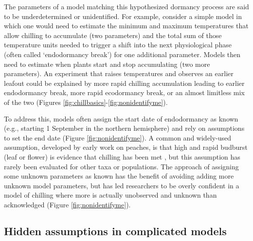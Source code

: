 \documentclass[11pt]{article}
\begin{document}
The parameters of a model matching this hypothesized dormancy process are said to be underdetermined or unidentified. For example, consider a simple model in which one would need to estimate the minimum and maximum temperatures that allow chilling to accumulate (two parameters) and the total sum of those temperature units needed to trigger a shift into the next physiological phase (often called `endodormancy break') for one additional parameter. Models then need to estimate when plants start and stop accumulating (two more parameters). An experiment that raises temperatures and observes an earlier leafout could be explained by more rapid chilling accumulation leading to earlier endodormancy break, more rapid ecodormancy break, or an almost limitless mix of the two (Figures \ref{fig:chillbasics}-\ref{fig:nonidentifyme}). %

To address this, models often assign the start date of endodormancy as known (e.g., starting 1 September in the northern hemisphere) and rely on assumptions to set the end date (Figure \ref{fig:nonidentifyme}). A common and widely-used assumption, developed by early work on peaches, is that high and rapid budburst (leaf or flower) is evidence that chilling has been met \citep[i.e. endodormancy has ended,][see also Figure \ref{fig:chillbasics}]{erez1971}, but this assumption has rarely been evaluated for other taxa or populations. The approach of assigning some unknown parameters as known has the benefit of avoiding adding more unknown model parameters, but has led researchers to be overly confident in a model of chilling where more is actually unobserved and unknown than acknowledged (Figure \ref{fig:nonidentifyme}). 

\subsection*{Hidden assumptions in complicated models}
\end{document}
